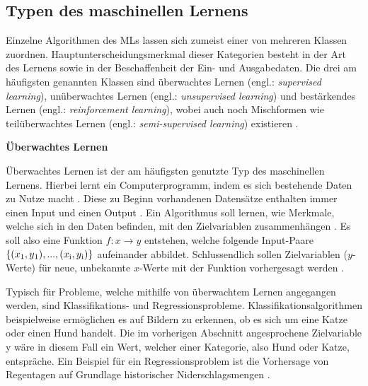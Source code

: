 \subsection{Typen des maschinellen Lernens}
\label{chap:Types}
Einzelne Algorithmen des MLs lassen sich zumeist einer von mehreren Klassen zuordnen. Hauptunterscheidungsmerkmal dieser Kategorien besteht in der Art des Lernens sowie in der Beschaffenheit der Ein- und Ausgabedaten. Die drei am häufigsten genannten Klassen sind überwachtes Lernen (engl.: \emph{supervised learning}), unüberwachtes Lernen (engl.: \emph{unsupervised learning}) und bestärkendes Lernen (engl.: \emph{reinforcement learning}), wobei auch noch Mischformen wie teilüberwachtes Lernen (engl.: \emph{semi-supervised learning}) existieren \cite{Alpaydin+2019, Wuttke.2022, ayodele}.

\textbf{Überwachtes Lernen}
\begin{addmargin}[25pt]{0pt}
Überwachtes Lernen ist der am häufigsten genutzte Typ des maschinellen Lernens. Hierbei lernt ein Computerprogramm, indem es sich bestehende Daten zu Nutze macht \cite{Verdhan.2020}. Diese zu Beginn vorhandenen Datensätze enthalten immer einen Input und einen Output \cite{Alpaydin+2019, Choo.2020}. Ein Algorithmus soll lernen, wie Merkmale, welche sich in den Daten befinden, mit den Zielvariablen zusammenhängen \cite{Wuttke.2022}. Es soll also eine Funktion $f:x \rightarrow y$ entstehen, welche folgende Input-Paare $\{(x\textsubscript{1}, y\textsubscript{1}), ... , (x\textsubscript{i}, y\textsubscript{i})\}$  aufeinander abbildet. Schlussendlich sollen Zielvariablen ($y$-Werte) für neue, unbekannte $x$-Werte mit der Funktion vorhergesagt werden \cite{Choo.2020}.

Typisch für Probleme, welche mithilfe von überwachtem Lernen angegangen werden, sind Klassifikations- und Regressionsprobleme. Klassifikationsalgorithmen beispielweise ermöglichen es auf Bildern zu erkennen, ob es sich um eine Katze oder einen Hund handelt. Die im vorherigen Abschnitt angesprochene Zielvariable y wäre in diesem Fall ein Wert, welcher einer Kategorie, also Hund oder Katze, entspräche. Ein Beispiel für ein Regressionsproblem ist die Vorhersage von Regentagen auf Grundlage historischer Niderschlagsmengen \cite{Choo.2020}. 
\end{addmargin}

